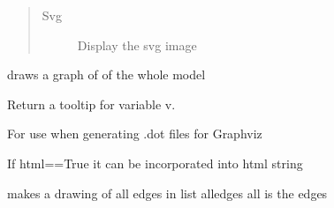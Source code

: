 \documentclass[letterpaper,10pt,english]{sphinxmanual}
\begin{document}
\begin{fulllineitems}
\begin{fulllineitems}
\begin{quote}
\begin{description}
\item[{Svg}] \leavevmode
\sphinxAtStartPar
Display the svg image

\end{description}\end{quote}

\end{fulllineitems}


\begin{fulllineitems}
\label{\detokenize{index:modelclass.Graph_Draw_Mixin.gdraw}}
\pysigstartsignatures
{}
\pysigstopsignatures
\sphinxAtStartPar
draws a graph of of the whole model

\end{fulllineitems}


\begin{fulllineitems}
\label{\detokenize{index:modelclass.Graph_Draw_Mixin.maketip}}
\pysigstartsignatures
{}
\pysigstopsignatures
\sphinxAtStartPar
Return a tooltip for variable v.

\sphinxAtStartPar
For use when generating .dot files for Graphviz

\sphinxAtStartPar
If html==True it can be incorporated into html string

\end{fulllineitems}


\begin{fulllineitems}
\label{\detokenize{index:modelclass.Graph_Draw_Mixin.makedotnew}}
\pysigstartsignatures
{}
\pysigstopsignatures
\sphinxAtStartPar
makes a drawing of all edges in list alledges
all is the edges


\end{fulllineitems}
\end{fulllineitems}
\end{document}
